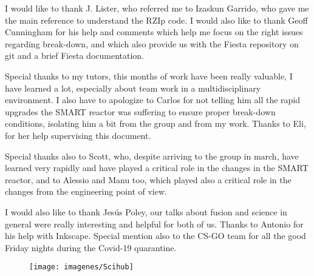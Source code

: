 \documentclass[a4paper,12pt,oneside]{book}
\begin{document}
I would like to thank J. Lister, who referred me to Izaskun Garrido, who gave me the main reference to understand the RZIp code.  I would also like to thank Geoff Cunningham for his help and comments which help me focus on the right issues regarding break-down, and which also provide us with the Fiesta repository on git and a brief Fiesta documentation.

Special thanks to my tutors, this months of work have been really valuable, I have learned a lot, especially about team work in a multidisciplinary environment. I also have to apologize to Carlos for not telling him all the rapid upgrades the SMART reactor was suffering to ensure proper break-down conditions, isolating him a bit from the group and from my work. Thanks to Eli, for her help supervising this document.

Special thanks also to Scott, who, despite arriving to the group in march,  have learned very rapidly and have played a critical role in the changes in the SMART reactor, and to Alessio and Manu too, which played also a critical role in the changes from the engineering point of view. 

I would also like to thank Jesús Poley, our talks about fusion and science in general were really interesting and helpful for both of us. Thanks to Antonio for his help with Inkscape. Special mention also to the CS-GO team for all the good Friday nights during the Covid-19 quarantine.




\begin{figure}[b]
\centering
\texttt{[image: imagenes/Scihub]}
\end{figure}



\tableofcontents %
\cleardoublepage %




\end{document}
